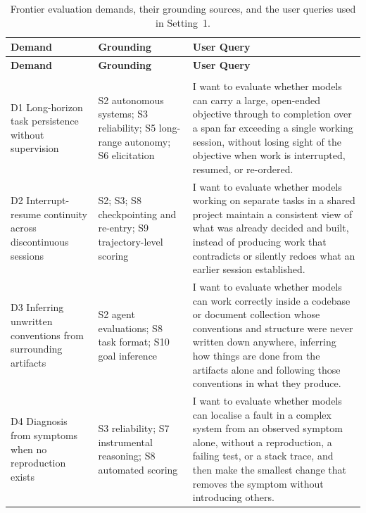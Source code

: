 \begingroup
\footnotesize
\renewcommand{\arraystretch}{1.08}
\begin{longtable}{@{}>{\raggedright\arraybackslash}p{1.25in}>{\raggedright\arraybackslash}p{1.35in}>{\raggedright\arraybackslash}p{2.5in}@{}}
\caption{Frontier evaluation demands, their grounding sources, and the user queries used in Setting~1.}\label{tab:domains}\\
\toprule
\textbf{Demand} & \textbf{Grounding} & \textbf{User Query} \\
\midrule
\endfirsthead
\toprule
\textbf{Demand} & \textbf{Grounding} & \textbf{User Query} \\
\midrule
\endhead
\midrule
\multicolumn{3}{r@{}}{Continued on next page} \\
\endfoot
\bottomrule
\endlastfoot
D1 Long-horizon task persistence without supervision
& S2 autonomous systems; S3 reliability; S5 long-range autonomy; S6 elicitation
& I want to evaluate whether models can carry a large, open-ended objective through to completion over a span far exceeding a single working session, without losing sight of the objective when work is interrupted, resumed, or re-ordered. \\

\midrule
D2 Interrupt-resume continuity across discontinuous sessions
& S2; S3; S8 checkpointing and re-entry; S9 trajectory-level scoring
& I want to evaluate whether models working on separate tasks in a shared project maintain a consistent view of what was already decided and built, instead of producing work that contradicts or silently redoes what an earlier session established. \\

\midrule
D3 Inferring unwritten conventions from surrounding artifacts
& S2 agent evaluations; S8 task format; S10 goal inference
& I want to evaluate whether models can work correctly inside a codebase or document collection whose conventions and structure were never written down anywhere, inferring how things are done from the artifacts alone and following those conventions in what they produce. \\

\midrule
D4 Diagnosis from symptoms when no reproduction exists
& S3 reliability; S7 instrumental reasoning; S8 automated scoring
& I want to evaluate whether models can localise a fault in a complex system from an observed symptom alone, without a reproduction, a failing test, or a stack trace, and then make the smallest change that removes the symptom without introducing others. \\


\end{longtable}
